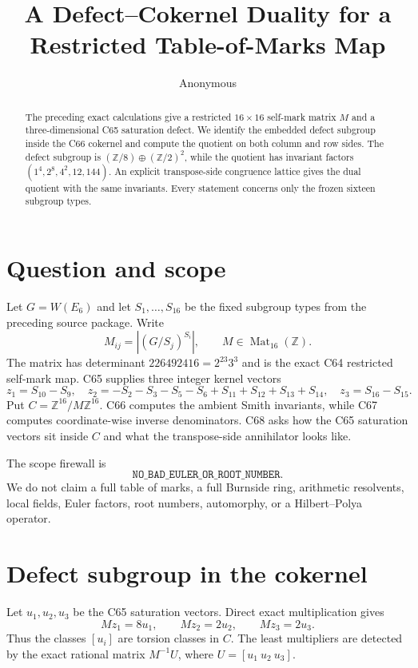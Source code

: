 \documentclass[10pt]{article}
\title{A Defect--Cokernel Duality for a Restricted Table-of-Marks Map}
\author{Anonymous}
\date{}
\newcommand{\Z}{\mathbb Z}
\begin{document}
\maketitle

\begin{abstract}
The preceding exact calculations give a restricted $16\times16$ self-mark
matrix $M$ and a three-dimensional C65 saturation defect.  We identify the
embedded defect subgroup inside the C66 cokernel and compute the quotient on
both column and row sides.  The defect subgroup is
$(\mathbb Z/8)\oplus(\mathbb Z/2)^2$, while the quotient has invariant factors
$(1^4,2^8,4^2,12,144)$.  An explicit transpose-side congruence lattice gives
the dual quotient with the same invariants.  Every statement concerns only
the frozen sixteen subgroup types.
\end{abstract}

\section{Question and scope}
Let $G=W(E_6)$ and let $S_1,\ldots,S_{16}$ be the fixed subgroup types from
the preceding source package.  Write
\[
 M_{ij}=|(G/S_j)^{S_i}|,
 \qquad M\in\operatorname{Mat}_{16}(\mathbb Z).
\]
The matrix has determinant $226492416=2^{23}3^3$ and is the exact C64
restricted self-mark map.  C65 supplies three integer kernel vectors
\[
 z_1=S_{10}-S_9,\quad
 z_2=-S_2-S_3-S_5-S_6+S_{11}+S_{12}+S_{13}+S_{14},\quad
 z_3=S_{16}-S_{15}.
\]
Put $C=\Z^{16}/M\Z^{16}$.  C66 computes the ambient Smith invariants,
while C67 computes coordinate-wise inverse denominators.  C68 asks how the
C65 saturation vectors sit inside $C$ and what the transpose-side annihilator
looks like.

The scope firewall is
\[
\texttt{NO\_BAD\_EULER\_OR\_ROOT\_NUMBER}.
\]
We do not claim a full table of marks, a full Burnside ring, arithmetic
resolvents, local fields, Euler factors, root numbers, automorphy, or a
Hilbert--Polya operator.

\section{Defect subgroup in the cokernel}
Let $u_1,u_2,u_3$ be the C65 saturation vectors.  Direct exact multiplication
gives
\[
 Mz_1=8u_1,\qquad Mz_2=2u_2,\qquad Mz_3=2u_3.
\]
Thus the classes $[u_i]$ are torsion classes in $C$.  The least multipliers
are detected by the exact rational matrix $M^{-1}U$, where
$U=[u_1\ u_2\ u_3]$.
\end{document}

